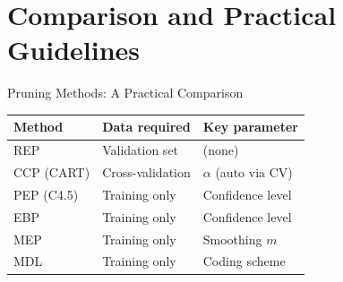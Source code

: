 \section{Comparison and Practical Guidelines}

\begin{frame}{Pruning Methods: A Practical Comparison}
  \renewcommand{\arraystretch}{1.4}
  \begin{center}
  \begin{tabular}{lll}
    \toprule
    \textbf{Method} & \textbf{Data required} & \textbf{Key parameter} \\
    \midrule
    REP  & Validation set & (none) \\
    CCP (CART) & Cross-validation & $\alpha$ (auto via CV) \\
    PEP (C4.5) & Training only & Confidence level \\
    EBP  & Training only & Confidence level \\
    MEP  & Training only & Smoothing $m$ \\
    MDL  & Training only & Coding scheme \\
    \bottomrule
  \end{tabular}
  \end{center}
\end{frame}

